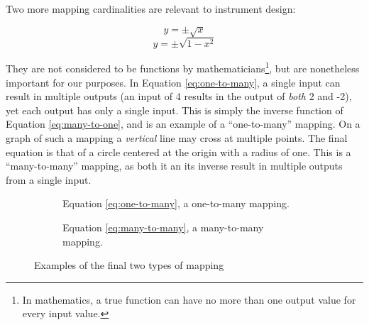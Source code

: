 Two more mapping cardinalities are relevant to instrument design:  

\begin{equation} y = \pm\sqrt{x} \label{eq:one-to-many} \end{equation} 
\begin{equation} y = \pm\sqrt{1 - x^2} \label{eq:many-to-many} \end{equation} 

They are not considered to be functions by mathematicians\footnote{In mathematics, a true function can have no more than one output value for every input value.}, but are nonetheless important for our purposes. In Equation \ref{eq:one-to-many}, a single input can result in multiple outputs (an input of 4 results in the output of \emph{both} 2 and -2), yet each output has only a single input. This is simply the inverse function of Equation \ref{eq:many-to-one}, and is an example of a ``one-to-many'' mapping. On a graph of such a mapping a \emph{vertical} line may cross at multiple points. The final equation is that of a circle centered at the origin with a radius of one. This is a ``many-to-many'' mapping, as both it an its inverse result in multiple outputs from a single input.

\begin{figure}
	\centering
	\begin{subfigure}[]{0.49\textwidth}
		\centering
		\caption{Equation \ref{eq:one-to-many}, a one-to-many mapping.}
	\end{subfigure}
	\begin{subfigure}[]{0.49\textwidth}
		\centering
		\caption{Equation \ref{eq:many-to-many}, a many-to-many mapping.}
	\end{subfigure}
	\caption{Examples of the final two types of mapping}\label{fig:one_to_many_and_many_to_many}
\end{figure}

